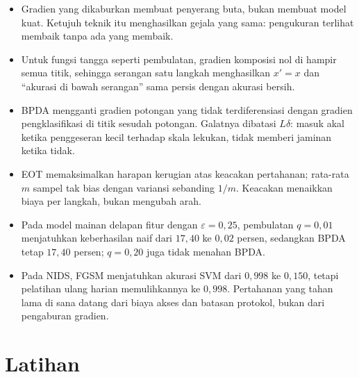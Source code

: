 
\begin{ringkasan}
\begin{itemize}
  \item Gradien yang dikaburkan membuat penyerang buta, bukan membuat model kuat.
        Ketujuh teknik itu menghasilkan gejala yang sama: pengukuran terlihat membaik
        tanpa ada yang membaik.
  \item Untuk fungsi tangga seperti pembulatan, gradien komposisi nol di hampir semua
        titik, sehingga serangan satu langkah menghasilkan $x'=x$ dan ``akurasi di bawah
        serangan'' sama persis dengan akurasi bersih.
  \item BPDA mengganti gradien potongan yang tidak terdiferensiasi dengan gradien
        pengklasifikasi di titik sesudah potongan. Galatnya dibatasi $L\delta$: masuk
        akal ketika penggeseran kecil terhadap skala lekukan, tidak memberi jaminan
        ketika tidak.
  \item EOT memaksimalkan harapan kerugian atas keacakan pertahanan; rata-rata $m$
        sampel tak bias dengan variansi sebanding $1/m$. Keacakan menaikkan biaya per
        langkah, bukan mengubah arah.
  \item Pada model mainan delapan fitur dengan $\varepsilon=0{,}25$, pembulatan
        $q=0{,}01$ menjatuhkan keberhasilan naif dari $17{,}40$ ke $0{,}02$ persen,
        sedangkan BPDA tetap $17{,}40$ persen; $q=0{,}20$ juga tidak menahan BPDA.
  \item Pada NIDS, FGSM menjatuhkan akurasi SVM dari $0{,}998$ ke $0{,}150$, tetapi
        pelatihan ulang harian memulihkannya ke $0{,}998$. Pertahanan yang tahan lama di
        sana datang dari biaya akses dan batasan protokol, bukan dari pengaburan gradien.
\end{itemize}
\end{ringkasan}

\section{Latihan}

